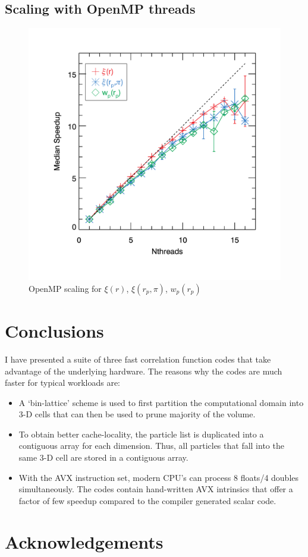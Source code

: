 \documentclass[preprint,authoryear,12pt]{elsarticle}
\newcommand{\xir}{\ensuremath{{\xi(r)}}\xspace}
\newcommand{\wprp}{\ensuremath{{w_p(r_p)}}\xspace}
\newcommand{\xirppi}{\ensuremath{{\xi(r_p,\pi)}}\xspace}
\begin{document}
\subsection{Scaling with OpenMP threads}
\begin{figure}[htbp]
\includegraphics[clip=true,width=\linewidth]{timings_Mr19_openmp}%
\caption{OpenMP scaling for \xir, \xirppi, \wprp }
\label{fig:scaling_openmp}
\end{figure}

\section{Conclusions}
I have presented a suite of three fast correlation function codes that take advantage of the underlying hardware. The reasons why the codes 
are much faster for typical workloads are:
\begin{itemize}
\item A `bin-lattice' scheme is used to first partition the computational domain into 3-D cells that can then be used to prune majority of the volume. 
\item To obtain better cache-locality, the particle list is duplicated into a contiguous array for each dimension. Thus, all particles that fall into the
same 3-D cell are stored in a contiguous array. 
\item With the AVX instruction set, modern CPU's can process 8 floats/4 doubles simultaneously. The codes contain hand-written AVX intrinsics that offer a 
factor of few speedup compared to the compiler generated scalar code. 
\end{itemize}

\citet{foreman-mackey_etal_13}

\section*{Acknowledgements}



\end{document}
